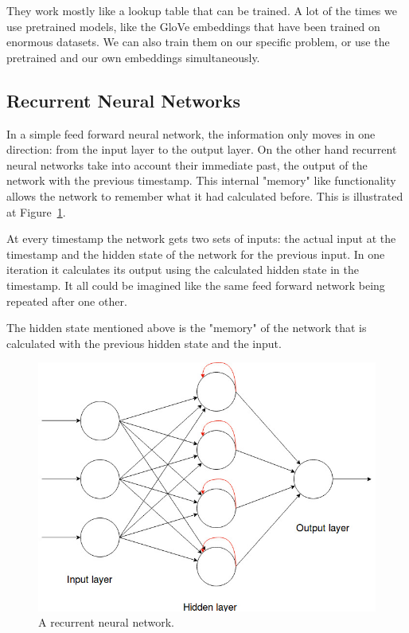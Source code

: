 They work mostly like a lookup table that can be trained. A lot of the times we use pretrained models, like the GloVe embeddings that have been trained on enormous datasets. We can also train them on our specific problem, or use the pretrained and our own embeddings simultaneously.
\FloatBarrier

\subsection{Recurrent Neural Networks}

In a simple feed forward neural network, the information only moves in one direction: from the input layer to the output layer. On the other hand recurrent neural networks take into account their immediate past, the output of the network with the previous timestamp. This internal "memory" like functionality allows the network to remember what it had calculated before. This is illustrated at Figure~\ref{fig:recurrent_net}.

At every timestamp the network gets two sets of inputs: the actual input at the timestamp and the hidden state of the network for the previous input. In one iteration it calculates its output using the calculated hidden state in the timestamp. It all could be imagined like the same feed forward network being repeated after one other.

The hidden state mentioned above is the "memory" of the network that is calculated with the previous hidden state and the input.

\begin{figure}[!htb]
	\centering
	\includegraphics[scale=0.5]{recurrent_neural_network.jpg}
	\caption{A recurrent neural network.}
	\label{fig:recurrent_net}
\end{figure}

